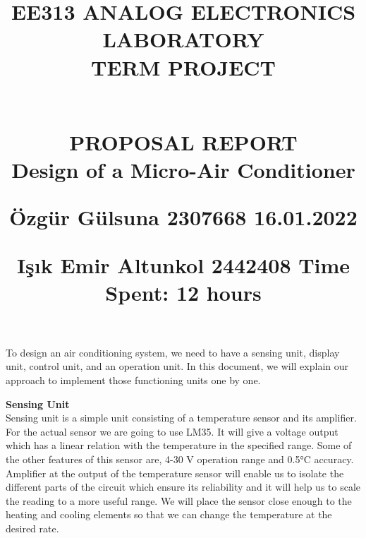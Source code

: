 \documentclass{METUHW} %
\begin{document}
\title{{%
\vspace{-3cm}
\scriptsize
\normalsize
\textbf{EE313 ANALOG ELECTRONICS LABORATORY \\ \small TERM PROJECT}\\
\large\\
}%

\textbf{
PROPOSAL REPORT\\
}
\small
Design of a Micro-Air Conditioner\\
\medskip
\medskip
\medskip
\small

Özgür Gülsuna 2307668 \hfill 16.01.2022\\
\raggedright
Işık Emir Altunkol 2442408 \hfill Time Spent: 12 hours

}

\author{ }
\date{ }
\maketitle


\vspace{-4em}

\justifying

    To design an air conditioning system, we need to have a sensing unit, display unit, control unit, and an operation unit. In this document, we will explain our approach to implement those functioning units one by one. \\
\medskip

\textbf{ \normalsize Sensing Unit}\\
    Sensing unit is a simple unit consisting of a temperature sensor and its amplifier. For the actual sensor we are going to use LM35. It will give a voltage output which has a linear relation with the temperature in the specified range. Some of the other features of this sensor are, 4-30 V operation range and 0.5°C accuracy. Amplifier at the output of the temperature sensor will enable us to isolate the different parts of the circuit which ensure its reliability and it will help us to scale the reading to a more useful range. We will place the sensor close enough to the heating and cooling elements so that we can change the temperature at the desired rate.\\

\medskip
\end{document}
